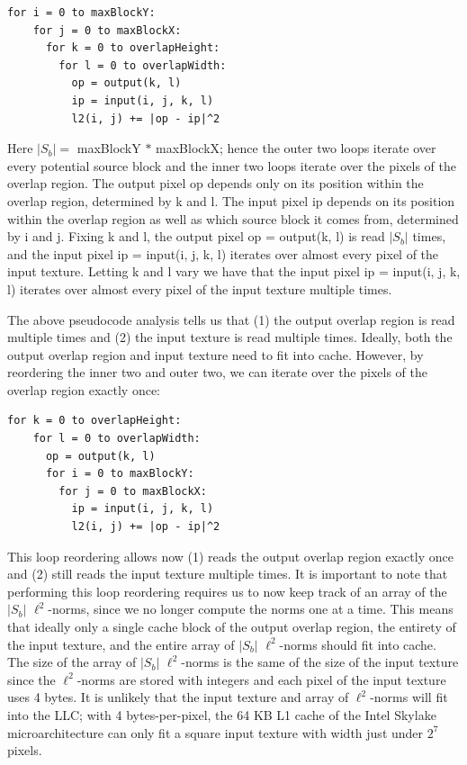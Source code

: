 \documentclass[letterpaper]{article}
\newcommand{\inline}[1]{{\ttfamily\hyphenchar\font=45 #1}}
\begin{document}
\begin{lstlisting}[style=cppstyle]
  for i = 0 to maxBlockY:
    for j = 0 to maxBlockX:
      for k = 0 to overlapHeight:
        for l = 0 to overlapWidth:
          op = output(k, l)
          ip = input(i, j, k, l)
          l2(i, j) += |op - ip|^2
\end{lstlisting}

Here $|S_b| =$ maxBlockY $ * $ maxBlockX; hence the outer two loops iterate over every potential source block and the inner two loops iterate over the pixels of the overlap region. The output pixel \inline{op} depends only on its position within the overlap region, determined by \inline{k} and \inline{l}. The input pixel \inline{ip} depends on its position within the overlap region as well as which source block it comes from, determined by \inline{i} and \inline{j}. Fixing \inline{k} and \inline{l}, the output pixel \inline{op = output(k, l)} is read $|S_b|$ times, and the input pixel \inline{ip = input(i, j, k, l)} iterates over almost every pixel of the input texture. Letting \inline{k} and \inline{l} vary we have that the input pixel \inline{ip = input(i, j, k, l)} iterates over almost every pixel of the input texture multiple times. 

The above pseudocode analysis tells us that (1) the output overlap region is read multiple times and (2) the input texture is read multiple times. Ideally, both the output overlap region and input texture need to fit into cache. However, by reordering the inner two and outer two, we can iterate over the pixels of the overlap region exactly once:

\begin{lstlisting}[style=cppstyle]
  for k = 0 to overlapHeight:
    for l = 0 to overlapWidth:
      op = output(k, l)
      for i = 0 to maxBlockY:
        for j = 0 to maxBlockX:
          ip = input(i, j, k, l)
          l2(i, j) += |op - ip|^2
\end{lstlisting}

This loop reordering allows now (1) reads the output overlap region exactly once and (2) still reads the input texture multiple times. It is important to note that performing this loop reordering requires us to now keep track of an array of the $|S_b|$ $\ell ^2$-norms, since we no longer compute the norms one at a time. This means that ideally only a single cache block of the output overlap region, the entirety of the input texture, and the entire array of $|S_b|$ $\ell ^2$-norms should fit into cache. The size of the array of $|S_b|$ $\ell ^2$-norms is the same of the size of the input texture since the $\ell ^2$-norms are stored with integers and each pixel of the input texture uses 4 bytes. It is unlikely that the input texture and array of $\ell ^2$-norms will fit into the LLC; with 4 bytes-per-pixel, the 64 KB L1 cache of the Intel Skylake microarchitecture can only fit a square input texture with width just under $2^7$ pixels.
\end{document}
